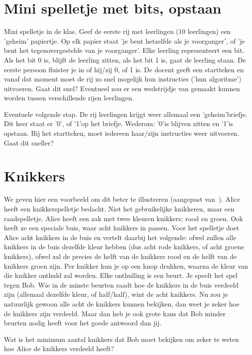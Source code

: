 \documentclass[../../main.tex]{subfiles}
\begin{document}
\section{Mini spelletje met bits, opstaan}
Mini spelletje in de klas. Geef de eerste rij met leerlingen (10 leerlingen) een 'geheim' papiertje. Op elk papier staat 'je bent hetzelfde als je voorganger', of 'je bent het tegenovergestelde van je voorganger'. Elke leerling representeert een bit. Als het bit 0 is, blijft de leerling zitten, als het bit 1 is, gaat de leerling staan. De eerste persoon fluister je in of hij/zij 0, of 1 is. De docent geeft een startteken en vanaf dat moment moet de rij zo snel mogelijk hun instructies ('hun algoritme') uitvoeren. Gaat dit snel? Eventueel zou er een wedstrijdje van gemaakt kunnen worden tussen verschillende rijen leerlingen.

Eventuele volgende stap. De rij leerlingen krijgt weer allemaal een 'geheim'briefje. Dit keer staat er '0', of '1'op het briefje. Wederom: '0'is blijven zitten en '1'is opstaan. Bij het startteken, moet iedereen haar/zijn instructies weer uitvoeren. Gaat dit sneller? 

\section{Knikkers}
We geven hier een voorbeeld om dit beter te illustreren (aangepast van~\cite{hensen2017}). Alice heeft een knikkerspelletje bedacht. Niet het gebruikelijke knikkeren, maar een raadspelletje. Alice heeft een zak met twee kleuren knikkers; rood en groen. Ook heeft ze een speciale buis, waar acht knikkers in passen. Voor het spelletje doet Alice acht knikkers in de buis en vertelt daarbij het volgende: ofwel zullen alle knikkers in de buis dezelfde kleur hebben (dus acht rode knikkers, of acht groene knikkers), ofwel zal de precies de helft van de knikkers rood en de helft van de knikkers groen zijn. Per knikker kun je op een knop drukken, waarna de kleur van die knikker onthuld zal worden. Elke onthulling is een beurt. Je speelt het spel tegen Bob. Wie in de minste beurten raadt hoe de knikkers in de buis verdeeld zijn (allemaal dezelfde kleur, of half/half), wint de acht knikkers.
Nu zou je natuurlijk gewoon alle acht de knikkers kunnen bekijken, dan weet je zeker hoe de knikkers zijn verdeeld. Maar dan heb je ook grote kans dat Bob minder beurten nodig heeft voor het goede antwoord dan jij.

Wat is het minimum aantal knikkers dat Bob moet bekijken om zeker te weten hoe Alice de knikkers verdeeld heeft?
\end{document}
